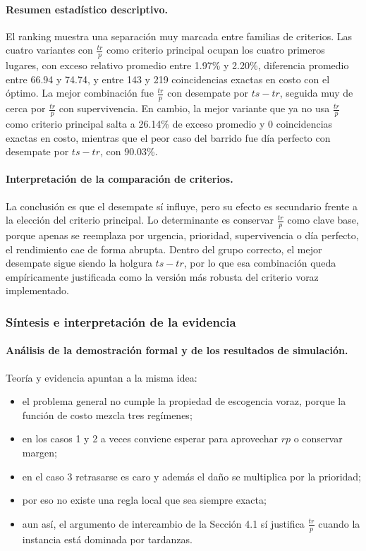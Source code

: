 \documentclass[12pt,a4paper]{article}
\begin{document}
\paragraph{Resumen estad\'istico descriptivo.}
El ranking muestra una separaci\'on muy marcada entre familias de criterios. Las cuatro variantes con \(\frac{tr}{p}\) como criterio principal ocupan los cuatro primeros lugares, con exceso relativo promedio entre 1.97\% y 2.20\%, diferencia promedio entre 66.94 y 74.74, y entre 143 y 219 coincidencias exactas en costo con el \'optimo. La mejor combinaci\'on fue \(\frac{tr}{p}\) con desempate por \(ts-tr\), seguida muy de cerca por \(\frac{tr}{p}\) con supervivencia. En cambio, la mejor variante que ya no usa \(\frac{tr}{p}\) como criterio principal salta a 26.14\% de exceso promedio y 0 coincidencias exactas en costo, mientras que el peor caso del barrido fue d\'ia perfecto con desempate por \(ts-tr\), con 90.03\%.

\paragraph{Interpretaci\'on de la comparaci\'on de criterios.}
La conclusi\'on es que el desempate s\'i influye, pero su efecto es secundario frente a la elecci\'on del criterio principal. Lo determinante es conservar \(\frac{tr}{p}\) como clave base, porque apenas se reemplaza por urgencia, prioridad, supervivencia o d\'ia perfecto, el rendimiento cae de forma abrupta. Dentro del grupo correcto, el mejor desempate sigue siendo la holgura \(ts-tr\), por lo que esa combinaci\'on queda emp\'iricamente justificada como la versi\'on m\'as robusta del criterio voraz implementado.

\subsubsection{S\'intesis e interpretaci\'on de la evidencia}

\paragraph{An\'alisis de la demostraci\'on formal y de los resultados de simulaci\'on.}
Teor\'ia y evidencia apuntan a la misma idea:
\begin{itemize}
  \item el problema general no cumple la propiedad de escogencia voraz, porque la funci\'on de costo mezcla tres reg\'imenes;
  \item en los casos 1 y 2 a veces conviene esperar para aprovechar \(rp\) o conservar margen;
  \item en el caso 3 retrasarse es caro y adem\'as el da\~no se multiplica por la prioridad;
  \item por eso no existe una regla local que sea siempre exacta;
  \item aun as\'i, el argumento de intercambio de la Secci\'on 4.1 s\'i justifica \(\frac{tr}{p}\) cuando la instancia est\'a dominada por tardanzas.
\end{itemize}
\end{document}
